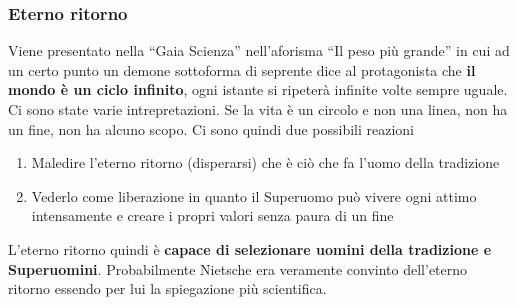 \subsubsection{Eterno ritorno}
Viene presentato nella ``Gaia Scienza'' nell'aforisma ``Il peso più grande'' in cui ad un certo punto
un demone sottoforma di seprente dice al protagonista che \textbf{il mondo è un ciclo infinito}, 
ogni istante si ripeterà infinite volte sempre uguale. Ci sono state varie intrepretazioni. Se la 
vita è un circolo e non una linea, non ha un fine, non ha alcuno scopo. Ci sono quindi due possibili 
reazioni
\begin{enumerate}
  \item Maledire l'eterno ritorno (disperarsi) che è ciò che fa l'uomo della tradizione
  \item Vederlo come liberazione in quanto il Superuomo può vivere ogni attimo intensamente e creare
    i propri valori senza paura di un fine
\end{enumerate}
L'eterno ritorno quindi è \textbf{capace di selezionare uomini della tradizione e Superuomini}.
Probabilmente Nietsche era veramente convinto dell'eterno ritorno essendo per lui la spiegazione
più scientifica.

